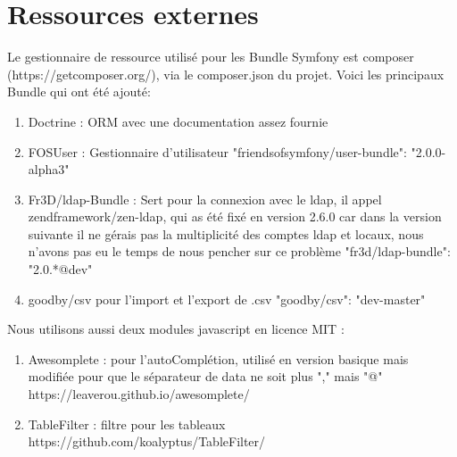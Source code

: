 \chapter{Ressources externes}
Le gestionnaire de ressource utilisé pour les Bundle Symfony est composer (https://getcomposer.org/), via le composer.json du projet.
Voici les principaux Bundle qui ont été ajouté:
 \newline
\begin{enumerate}

\item Doctrine : ORM avec une documentation assez fournie
 \newline
 \item FOSUser : Gestionnaire d'utilisateur
 \newline	"friendsofsymfony/user-bundle": "2.0.0-alpha3"
	 \newline
\item Fr3D/ldap-Bundle : Sert pour la connexion avec le ldap, il appel zendframework/zen-ldap, qui as été fixé en version 2.6.0 car dans la version suivante il ne gérais pas la multiplicité des comptes ldap et locaux, nous n'avons pas eu le temps de nous pencher sur ce problème
     \newline    "fr3d/ldap-bundle": "2.0.*@dev"
         \newline
\item goodby/csv pour l'import et l'export de .csv
    \newline     "goodby/csv": "dev-master"
 \newline
\end{enumerate}


Nous utilisons aussi deux modules javascript en licence MIT :

 \begin{enumerate}

\item Awesomplete : pour l'autoComplétion, utilisé en version basique mais modifiée pour que le séparateur de data ne soit plus "," mais "@"
\newline https://leaverou.github.io/awesomplete/
	\newline
\item TableFilter : filtre pour les tableaux
\newline https://github.com/koalyptus/TableFilter/	
\newline

\end{enumerate}
